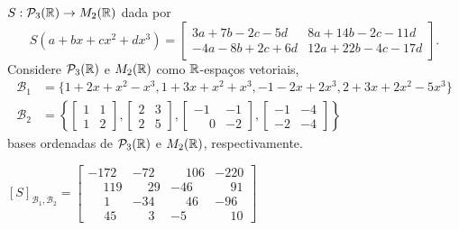\documentclass[12pt]{exam}
\begin{document}
\begin{exercicio}
    $S : \mathcal{P}_3(\mathbb{R}) \to M_2(\mathbb{R})$ dada por
    \[
    S(a + bx + cx^2 + dx^3) = \begin{bmatrix}
        3a + 7b - 2c - 5d & 8a + 14b - 2c - 11d\\
        -4a - 8b + 2c + 6d & 12a + 22b - 4c - 17d
    \end{bmatrix}.
    \]
    Considere $\mathcal{P}_3(\mathbb{R})$ e $M_2(\mathbb{R})$ como $\mathbb{R}$-espaços vetoriais,
    \begin{align*}
        \mathcal{B}_1 &= \{1 + 2x + x^2 - x^3, 1 + 3x + x^2 + x^3, -1 - 2x + 2x^3, 2 + 3x + 2x^2 - 5x^3\}\\
        \mathcal{B}_2 &= \left\{\begin{bmatrix}
            1 & 1\\1 & 2
        \end{bmatrix}, \begin{bmatrix}
            2 & 3\\2 & 5
        \end{bmatrix}, \begin{bmatrix}
            -1 & -1\\\phantom{-}0 & -2
        \end{bmatrix}, \begin{bmatrix}
            -1 & -4\\-2 & -4
        \end{bmatrix}\right\}
    \end{align*}
    bases ordenadas de $\mathcal{P}_3(\mathbb{R})$ e $M_2(\mathbb{R})$, respectivamente.

    \begin{solucao}
        $[S]_{\mathcal{B}_1, \mathcal{B}_2} = \begin{bmatrix}
            -172& -72 & \phantom{-}106 & -220\\
            \phantom{-}119 & \phantom{-}29 & -46 & \phantom{-}91\\
            \phantom{-1}1 & -34 & \phantom{-}46 & -96\\
            \phantom{-1}45 & \phantom{-1}3 & -5 & \phantom{-}10
        \end{bmatrix}$
    \end{solucao}
\end{exercicio}
\end{document}
